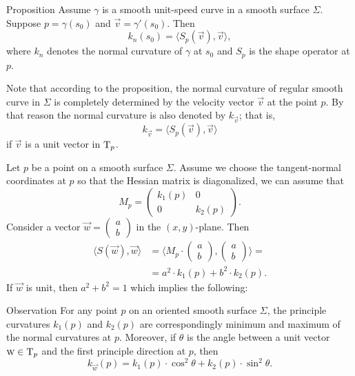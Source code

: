 \begin{thm}{Proposition}\label{prop:normal-shape}
Assume $\gamma$ is a smooth unit-speed curve in a smooth surface $\Sigma$.
Suppose $p=\gamma(s_0)$ and $\vec v=\gamma'(s_0)$.
Then 
\[k_n(s_0)=\langle S_p(\vec v),\vec v\rangle,\]
where $k_n$ denotes the normal curvature of $\gamma$ at $s_0$ and $S_p$ is the shape operator at $p$.
\end{thm}

Note that according to the proposition, the normal curvature of regular smooth curve in $\Sigma$ is completely determined by the velocity vector $\vec v$ at the point $p$.
By that reason the normal curvature is also denoted by $k_{\vec v}$;
that is,
\[k_{\vec v}=\langle S_p(\vec v),\vec v\rangle\]
if $\vec v$ is a unit vector in $\mathrm{T}_p$.







Let $p$ be a point on a smooth surface $\Sigma$.
Assume we choose the tangent-normal coordinates at $p$ so that the Hessian matrix is diagonalized, we can assume that
\[M_p=\begin{pmatrix}
   k_1(p)
   &0
   \\
   0
   &k_2(p)
  \end{pmatrix}.
\]
Consider a vector ${\vec w}=(\begin{smallmatrix}a\\b
\end{smallmatrix})$ in the $(x,y)$-plane.
Then
\begin{align*}
\langle S(\vec w),\vec w\rangle
&=\langle M_p\cdot(\begin{smallmatrix}a\\b
\end{smallmatrix}),(\begin{smallmatrix}a\\b
\end{smallmatrix})\rangle=
\\
&=a^2\cdot k_1(p) +b^2\cdot k_2(p). 
\end{align*}
If ${\vec w}$ is unit, then $a^2+b^2=1$ which implies the following:

\begin{thm}{Observation}\label{obs:k1-k2}
For any point $p$ on an oriented smooth surface $\Sigma$,
the principle curvatures $k_1(p)$ and $k_2(p)$ are correspondingly minimum and maximum of the normal curvatures at $p$.
Moreover, if $\theta$ is the angle between a unit vector ${\textsc w}\in\mathrm{T}_p$ and the first principle direction at $p$, then 
\[k_{\vec w}(p)=k_1(p)\cdot\cos^2\theta+k_2(p)\cdot\sin^2\theta.\]

\end{thm}

